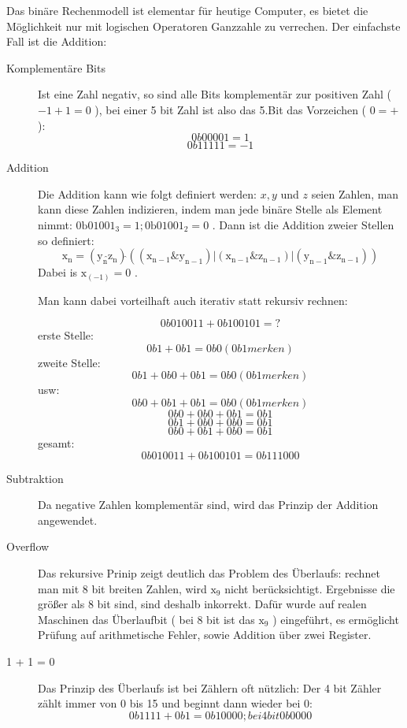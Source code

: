 \documentclass[a4paper,12pt,oneside]{scrreprt}
\begin{document}
Das binäre Rechenmodell ist elementar für heutige Computer, es bietet die Möglichkeit nur mit logischen Operatoren 
Ganzzahle zu verrechen. Der einfachste Fall ist die Addition:

\begin{description}

\item[Komplementäre Bits] Ist eine Zahl negativ, so sind alle Bits komplementär zur positiven Zahl ( $ -1 + 1 = 0 $  ), bei einer 5 bit Zahl ist also das 5.Bit das Vorzeichen ( $ 0 = + $):
	$$ 0b00001 = 1 $$
	$$ 0b11111 = -1 $$
	
\item[Addition] Die Addition kann wie folgt definiert werden: $ x, y $ und $ z $ seien Zahlen, man kann diese Zahlen indizieren, indem man jede binäre Stelle als Element nimmt: $ \mathrm{0b01001_{3}} = 1 ; \mathrm{0b01001_{2}} = 0 $ . Dann ist die Addition zweier Stellen so definiert:
	$$ \mathrm{x_n} = ( \mathrm{y_n} \hat{  } \mathrm{z_n} ) \hat{  } \mathrm{( ( x_{n-1} \& y_{n-1} ) | ( x_{n-1} \& z_{n-1} ) | ( y_{n-1} \& z_{n-1} ) ) } $$ 
Dabei is $ \mathrm{x_{(-1)}} = 0 $ .

Man kann dabei vorteilhaft auch iterativ statt rekursiv rechnen:

	$$ 0b010011 + 0b100101 = ? $$
	erste Stelle:
	$$ 0b1 + 0b1 = 0b0 ( 0b1 merken ) $$
	zweite Stelle:
	$$ 0b1 + 0b0 + 0b1 = 0b0 ( 0b1 merken) $$
	usw:
	$$ 0b0 + 0b1 + 0b1 = 0b0 ( 0b1 merken) $$
	$$ 0b0 + 0b0 + 0b1 = 0b1 $$
	$$ 0b1 + 0b0 + 0b0 = 0b1 $$
	$$ 0b0 + 0b1 + 0b0 = 0b1 $$
	gesamt:
	$$ 0b010011 + 0b100101 = 0b111000 $$

\item[Subtraktion] Da negative Zahlen komplementär sind, wird das Prinzip der Addition angewendet.

\item[Overflow] Das rekursive Prinip zeigt deutlich das Problem des Überlaufs: rechnet man mit 8 bit breiten Zahlen, wird $\mathrm{x_9} $ nicht berücksichtigt. Ergebnisse die größer als 8 bit sind, sind deshalb inkorrekt. Dafür wurde auf realen Maschinen das Überlaufbit ( bei 8 bit ist das $ \mathrm{x_9} $ ) eingeführt, es ermöglicht Prüfung auf arithmetische Fehler, sowie Addition über zwei Register.

\item[ 1 + 1 = 0 ] Das Prinzip des Überlaufs ist bei Zählern oft nützlich: Der 4 bit Zähler zählt immer von 0 bis 15 und beginnt dann wieder bei 0:
	$$ 0b1111 + 0b1 = 0b10000 ; bei 4 bit 0b0000 $$

\end{description}
\end{document}
